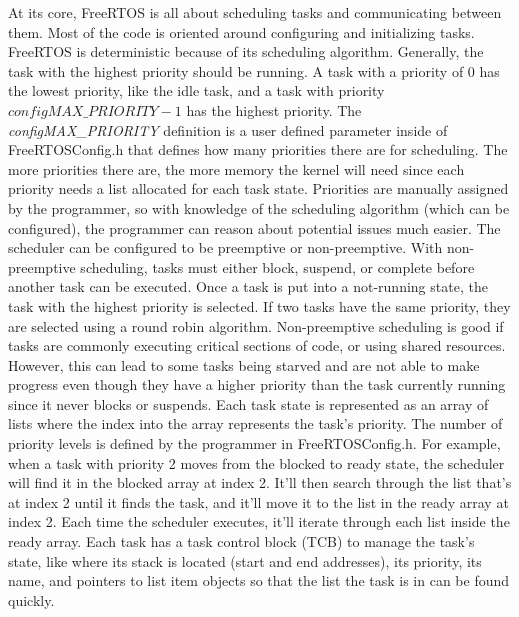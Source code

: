At its core, FreeRTOS is all about scheduling tasks and communicating between
them. Most of the code is oriented around configuring and initializing tasks.
FreeRTOS is deterministic because of its scheduling algorithm. Generally, the
task with the highest priority should be running. A task with a priority of 0
has the lowest priority, like the idle task, and a task with priority
$configMAX\_PRIORITY - 1$ has the highest priority. The
\emph{configMAX\_PRIORITY} definition is a user defined parameter inside of
FreeRTOSConfig.h that defines how many priorities there are for scheduling. The
more priorities there are, the more memory the kernel will need since each
priority needs a list allocated for each task state. Priorities are manually
assigned by the programmer, so with knowledge of the scheduling algorithm (which
can be configured), the programmer can reason about potential issues much
easier. The scheduler can be configured to be preemptive or non-preemptive. With
non-preemptive scheduling, tasks must either block, suspend, or complete before
another task can be executed. Once a task is put into a not-running state, the
task with the highest priority is selected. If two tasks have the same priority,
they are selected using a round robin algorithm. Non-preemptive scheduling is
good if tasks are commonly executing critical sections of code, or using shared
resources.  However, this can lead to some tasks being starved and are not able
to make progress even though they have a higher priority than the task currently
running since it never blocks or suspends. Each task state is represented as an
array of lists where the index into the array represents the task's priority.
The number of priority levels is defined by the programmer in FreeRTOSConfig.h.
For example, when a task with priority 2 moves from the blocked to ready state,
the scheduler will find it in the blocked array at index 2. It'll then search
through the list that's at index 2 until it finds the task, and it'll move it to
the list in the ready array at index 2. Each time the scheduler executes, it'll
iterate through each list inside the ready array. Each task has a task control
block (TCB) to manage the task's state, like where its stack is located (start
and end addresses), its priority, its name, and pointers to list item objects so
that the list the task is in can be found quickly.

